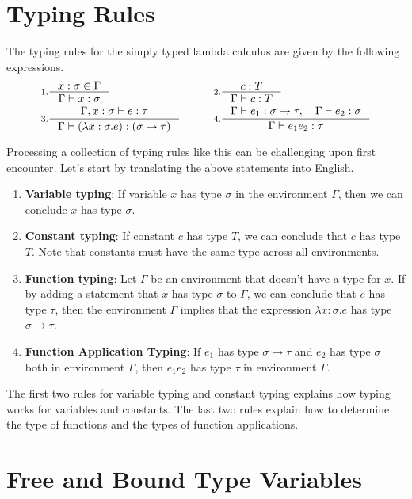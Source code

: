 \documentclass[book.tex]{subfiles}
\begin{document}
\section{Typing Rules}
The typing rules for the simply typed lambda calculus are given by the following expressions.
\begin{alignat*}{2}
    &\inference[1.]
    {
     x: \sigma \in \Gamma
    }
    {
    \Gamma \vdash x : \sigma
    } &&\qquad
    \inference[2.]
    {
     c : T
    }
    {
     \Gamma \vdash c : T 
    } \\
    &\inference[3.]
    {
     \Gamma, x: \sigma \vdash e : \tau
    }
    {
     \Gamma \vdash (\lambda x: \sigma . e) : (\sigma \to \tau)
    }
    &&\qquad 
    \inference[4.]
    { 
     \Gamma \vdash e_1: \sigma \to \tau, \quad \Gamma \vdash e_2 : \sigma
    }
    {
     \Gamma \vdash e_1 e_2 : \tau
    }
    \\
\end{alignat*}

Processing a collection of typing rules like this can be challenging upon first encounter. Let's start by translating the above statements into English.
\begin{enumerate}
    \item \textbf{Variable typing}: If variable $x$ has type $\sigma$ in the environment $\Gamma$, then we can conclude $x$ has type $\sigma$.
    \item \textbf{Constant typing}: If constant $c$ has type $T$, we can conclude that $c$ has type $T$. Note that constants must have the same type across all environments.
    \item \textbf{Function typing}: Let $\Gamma$ be an environment that doesn't have a type for $x$. If by adding a statement that $x$ has type $\sigma$ to $\Gamma$, we can conclude that $e$ has type $\tau$, then the environment $\Gamma$ implies that the expression $\lambda x: \sigma . e$ has type $\sigma \to \tau$.
    \item \textbf{Function Application Typing}: If $e_1$ has type $\sigma \to \tau$ and $e_2$ has type $\sigma$ both in environment $\Gamma$, then $e_1 e_2$ has type $\tau$ in environment $\Gamma$.
\end{enumerate}
The first two rules for variable typing and constant typing explains how typing works for variables and constants. The last two rules explain how to determine the type of functions and the types of function applications.

\section{Free and Bound Type Variables}
\end{document}

